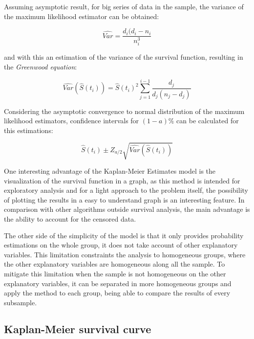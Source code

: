 \documentclass[11pt]{book} %
\begin{document}
    Assuming asymptotic result, for big series of data in the sample, the variance of the maximum likelihood estimator can be obtained:

    \begin{equation}
      \widehat{Var} = \frac{d_i(d_i-n_i}{n_i^3}
      \label{eq:km-havar-variance}
    \end{equation}

    and with this an estimation of the variance of the survival function, resulting in the \emph{Greenwood equation}:

    \begin{equation}
      \widehat{Var}(\widehat{S}(t_i)) = \widehat{S}(t_i)^2 \sum_{j=1}^{i-1} \frac{d_j}{d_j(n_j-d_j)}
      \label{eq:km-greenwood-eq}
    \end{equation}

    Considering the asymptotic convergence to normal distribution of the maximum likelihood estimators, confidence intervals for $(1 - a)\%$ can be calculated for this estimations:

    \begin{equation}
      \widehat{S}(t_i)\pm Z_{a/2}\sqrt{\widehat{Var}(\widehat{S}(t_i))}
      \label{eq:km-confidence-intervals}
    \end{equation}

    One interesting advantage of the Kaplan-Meier Estimates model is the visualization of the survival function in a graph, as this method is intended for exploratory analysis and for a light approach to the problem itself, the possibility of plotting the results in a easy to understand graph is an interesting feature. In comparison with other algorithms outside survival analysis, the main advantage is the ability to account for the censored data.

    The other side of the simplicity of the model is that it only provides probability estimations on the whole group, it does not take account of other explanatory variables. This limitation constraints the analysis to homogeneous groups, where the other explanatory variables are homogeneous along all the sample. To mitigate this limitation when the sample is not homogeneous on the other explanatory variables, it can be separated in more homogeneous groups and apply the method to each group, being able to compare the results of every subsample.

    \subsection{Kaplan-Meier survival curve}
\end{document}
